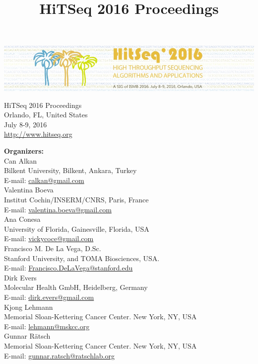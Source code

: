 \documentclass[11pt]{article}
\date{}
\author{}
\title{
  HiTSeq 2016 Proceedings
}
\begin{document}

\begin{center}
\includegraphics[scale=0.5]{hitseq_banner.jpg}

\vspace*{1cm}
{\Huge HiTSeq 2016 Proceedings}\\
\vspace*{1cm}
Orlando, FL, United States \\
July 8-9, 2016\\
\url{http://www.hitseq.org}
\end{center}


\noindent
{\bf Organizers:}\\

\noindent
Can Alkan\\
Bilkent University, Bilkent, Ankara, Turkey\\
E-mail: \url{calkan@gmail.com}\\

\noindent
Valentina Boeva\\
Institut Cochin/INSERM/CNRS, Paris, France\\
E-mail: \url{valentina.boeva@gmail.com}\\

\noindent
Ana Conesa\\
University of Florida, Gainesville, Florida, USA\\
E-mail: \url{vickycoce@gmail.com}\\

\noindent
Francisco M. De La Vega, D.Sc.\\
Stanford University, and TOMA Biosciences, USA.\\
E-mail: \url{Francisco.DeLaVega@stanford.edu}\\

\noindent
Dirk Evers\\
Molecular Health GmbH, Heidelberg, Germany\\
E-mail: \url{dirk.evers@gmail.com}\\

\noindent
Kjong Lehmann\\
Memorial Sloan-Kettering Cancer Center. New York, NY, USA\\
E-mail: \url{lehmann@mskcc.org}\\

\noindent
Gunnar Rätsch\\
Memorial Sloan-Kettering Cancer Center. New York, NY, USA\\
E-mail: \url{gunnar.ratsch@ratschlab.org}
\end{document}
